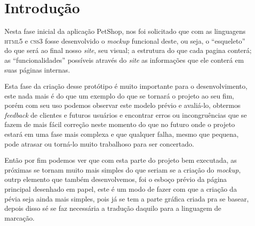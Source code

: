 \chapter{Introdução}

Nesta fase inicial da aplicação PetShop, nos foi solicitado que com as
linguagens \textsc{html5} e \textsc{css3} fosse desenvolvido o \emph{mockup}
funcional deste, ou seja, o “esqueleto” do que será ao final nosso \emph{site},
seu visual; a estrutura do que cada pagina conterá; as “funcionalidades”
possíveis através do \emph{site} as informações que ele conterá em suas páginas
internas.

Esta fase da criação desse protótipo é muito importante para o desenvolvimento,
este nada mais é do que um exemplo do que se tornará o projeto ao seu fim,
porém com seu uso podemos observar este modelo prévio e avaliá-lo, obtermos
\emph{feedback} de clientes e futuros usuários e encontrar erros ou incongruências
que se fazem de mais fácil correção neste momento do que no futuro onde o
projeto estará em uma fase mais complexa e que qualquer falha, mesmo que
pequena, pode atrasar ou torná-lo muito trabalhoso para ser concertado.

Então por fim podemos ver que com esta parte do projeto bem executada, as
próximas se tornam muito mais simples do que seriam se a criação do \emph{mockup},
outrp elemento que também desenvolvemos, foi o esboço prévio da página
principal desenhado em papel, este é um modo de fazer com que a criação da
pévia seja ainda mais simples, pois já se tem a parte gráfica criada pra se
basear, depois disso sé se faz necessária a tradução daquilo para a linguagem
de marcação.